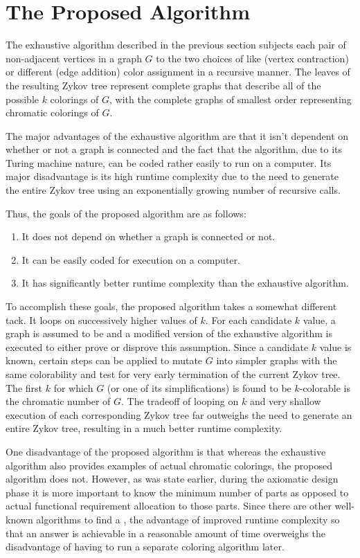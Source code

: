 \section{The Proposed Algorithm}

The exhaustive algorithm described in the previous section subjects each pair of non-adjacent vertices in a graph
\(G\) to the two choices of like (vertex contraction) or different (edge addition) color assignment in a recursive
manner.  The leaves of the resulting Zykov tree represent complete graphs that describe all of the possible \(k\)
colorings of \(G\), with the complete graphs of smallest order representing chromatic colorings of \(G\).

The major advantages of the exhaustive algorithm are that it isn't dependent on whether or not a graph is connected
and the fact that the algorithm, due to its Turing machine nature, can be coded rather easily to run on a computer.
Its major disadvantage is its high runtime complexity due to the need to generate the entire Zykov tree using an
exponentially growing number of recursive calls.

Thus, the goals of the proposed algorithm are as follows:
\begin{enumerate}
\item It does not depend on whether a graph is connected or not.
\item It can be easily coded for execution on a computer.
\item It has significantly better runtime complexity than the exhaustive algorithm.
\end{enumerate}

To accomplish these goals, the proposed algorithm takes a somewhat different tack.  It loops on successively higher
values of \(k\).  For each candidate \(k\) value, a graph is assumed to be  and a modified version of
the exhaustive algorithm is executed to either prove or disprove this assumption.  Since a candidate \(k\) value is
known, certain steps can be applied to mutate \(G\) into simpler graphs with the same colorability and test for
very early termination of the current Zykov tree.  The first \(k\) for which \(G\) (or one of its simplifications)
is found to be \(k\)-colorable is the chromatic number of \(G\).  The tradeoff of looping on \(k\) and very shallow
execution of each corresponding Zykov tree far outweighs the need to generate an entire Zykov tree, resulting in a
much better runtime complexity.

One disadvantage of the proposed algorithm is that whereas the exhaustive algorithm also provides examples of actual
chromatic colorings, the proposed algorithm does not.  However, as was state earlier, during the axiomatic design
phase it is more important to know the minimum number of parts as opposed to actual functional requirement allocation
to those parts.  Since there are other well-known algorithms to find a , the advantage of improved
runtime complexity so that an answer is achievable in a reasonable amount of time overweighs the disadvantage of
having to run a separate coloring algorithm later.


